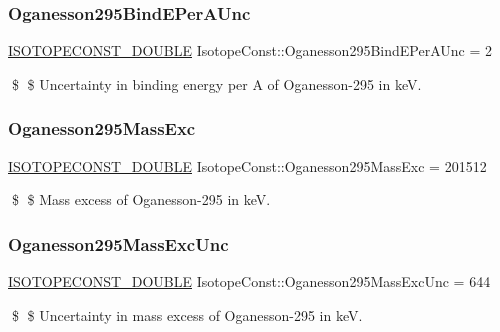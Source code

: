 \subsubsection{\texorpdfstring{Oganesson295\+Bind\+E\+Per\+A\+Unc}{Oganesson295BindEPerAUnc}}
{\footnotesize\ttfamily \mbox{\hyperlink{group___isotope_const-_macros_ga8f45a7272ce02c0b4c65c44636ed719a}{I\+S\+O\+T\+O\+P\+E\+C\+O\+N\+S\+T\+\_\+\+D\+O\+U\+B\+LE}} Isotope\+Const\+::\+Oganesson295\+Bind\+E\+Per\+A\+Unc = 2}

\$ \$ Uncertainty in binding energy per A of Oganesson-\/295 in keV. \mbox{\label{group___isotope_const-_oganesson-_og295_gab1da341344b4c72cac7b1ed10b530f26}} 
\subsubsection{\texorpdfstring{Oganesson295\+Mass\+Exc}{Oganesson295MassExc}}
{\footnotesize\ttfamily \mbox{\hyperlink{group___isotope_const-_macros_ga8f45a7272ce02c0b4c65c44636ed719a}{I\+S\+O\+T\+O\+P\+E\+C\+O\+N\+S\+T\+\_\+\+D\+O\+U\+B\+LE}} Isotope\+Const\+::\+Oganesson295\+Mass\+Exc = 201512}

\$ \$ Mass excess of Oganesson-\/295 in keV. \mbox{\label{group___isotope_const-_oganesson-_og295_gac36d8afe03e3ad52778392153a12769e}} 
\subsubsection{\texorpdfstring{Oganesson295\+Mass\+Exc\+Unc}{Oganesson295MassExcUnc}}
{\footnotesize\ttfamily \mbox{\hyperlink{group___isotope_const-_macros_ga8f45a7272ce02c0b4c65c44636ed719a}{I\+S\+O\+T\+O\+P\+E\+C\+O\+N\+S\+T\+\_\+\+D\+O\+U\+B\+LE}} Isotope\+Const\+::\+Oganesson295\+Mass\+Exc\+Unc = 644}

\$ \$ Uncertainty in mass excess of Oganesson-\/295 in keV. \mbox{\label{group___isotope_const-_oganesson-_og295_gaffc340c75152cc09dad82a6767180c09}} 
